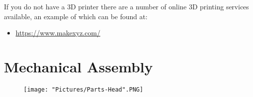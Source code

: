 \documentclass[12pt]{article}
\begin{document}
If you do not have a 3D printer there are a number of online 3D printing services available, an example of which can be found at:

\begin{itemize}
	\item \href{https://www.makexyz.com/}{https://www.makexyz.com/}
\end{itemize}

\section{Mechanical Assembly}

\begin{figure}[H]
	\centering
	\texttt{[image: "Pictures/Parts-Head".PNG]}
\end{figure}
\end{document}
